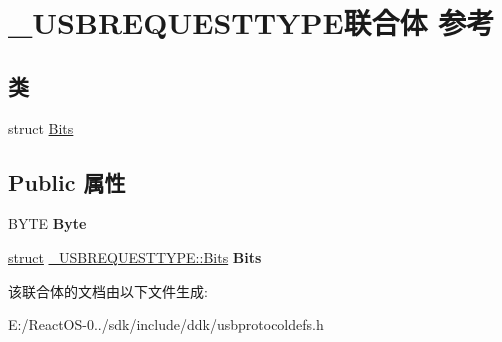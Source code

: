 \hypertarget{union___u_s_b_r_e_q_u_e_s_t_t_y_p_e}{}\section{\+\_\+\+U\+S\+B\+R\+E\+Q\+U\+E\+S\+T\+T\+Y\+P\+E联合体 参考}
\label{union___u_s_b_r_e_q_u_e_s_t_t_y_p_e}
\subsection*{类}
\begin{DoxyCompactItemize}
\item 
struct \hyperlink{struct___u_s_b_r_e_q_u_e_s_t_t_y_p_e_1_1_bits}{Bits}
\end{DoxyCompactItemize}
\subsection*{Public 属性}
\begin{DoxyCompactItemize}
\item 
\mbox{\label{union___u_s_b_r_e_q_u_e_s_t_t_y_p_e_a3fa559b18f0aea1f1efcc79ce12e06d8}} 
B\+Y\+TE {\bfseries Byte}
\item 
\mbox{\label{union___u_s_b_r_e_q_u_e_s_t_t_y_p_e_a005921c6e4e0ded1158dd79762bbf95e}} 
\hyperlink{interfacestruct}{struct} \hyperlink{struct___u_s_b_r_e_q_u_e_s_t_t_y_p_e_1_1_bits}{\+\_\+\+U\+S\+B\+R\+E\+Q\+U\+E\+S\+T\+T\+Y\+P\+E\+::\+Bits} {\bfseries Bits}
\end{DoxyCompactItemize}


该联合体的文档由以下文件生成\+:\begin{DoxyCompactItemize}
\item 
E\+:/\+React\+O\+S-\/0../sdk/include/ddk/usbprotocoldefs.\+h\end{DoxyCompactItemize}
